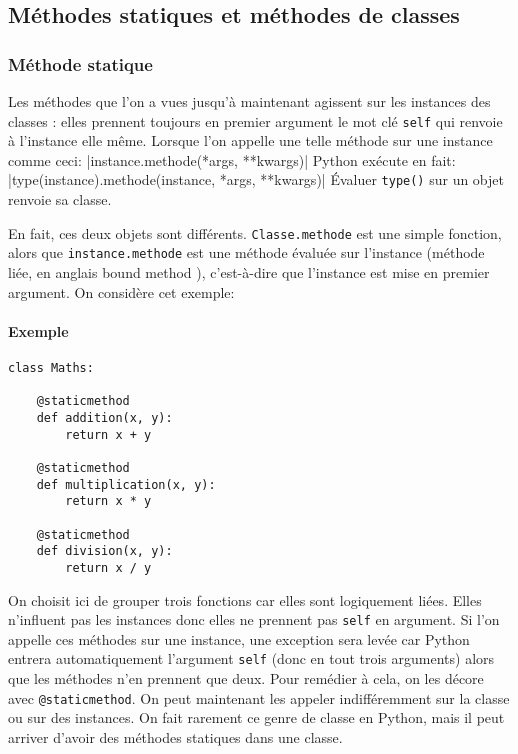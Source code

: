 \subsection{Méthodes statiques et méthodes de classes}
\subsubsection{Méthode statique}
\label{sec:staticmethod}
Les méthodes que l'on a vues jusqu'à maintenant agissent sur les instances des classes : elles prennent toujours en premier argument le mot clé \texttt{self} qui renvoie à l'instance elle même. Lorsque l'on appelle une telle méthode sur une instance comme ceci:
|instance.methode(*args, **kwargs)|
Python exécute en fait: |type(instance).methode(instance, *args, **kwargs)|
Évaluer \texttt{type()} sur un objet renvoie sa classe.

En fait, ces deux objets sont différents. \texttt{Classe.methode} est une simple fonction, alors que \texttt{instance.methode} est une méthode évaluée sur l'instance (méthode liée, en anglais \og bound method \fg{}), c'est-à-dire que l'instance est mise en premier argument. On considère cet exemple:

\paragraph{Exemple}
\begin{verbatim}
class Maths:

    @staticmethod
    def addition(x, y):
        return x + y

    @staticmethod
    def multiplication(x, y):
        return x * y

    @staticmethod
    def division(x, y):
        return x / y
\end{verbatim}
On choisit ici de grouper trois fonctions car elles sont logiquement liées. Elles n'influent pas les instances donc elles ne prennent pas \texttt{self} en argument. Si l'on appelle ces méthodes sur une instance, une exception sera levée car Python entrera automatiquement l'argument \texttt{self} (donc en tout trois arguments) alors que les méthodes n'en prennent que deux. Pour remédier à cela, on les décore avec \texttt{@staticmethod}. On peut maintenant les appeler indifféremment sur la classe ou sur des instances. On fait rarement ce genre de classe en Python, mais il peut arriver d'avoir des méthodes statiques dans une classe.

